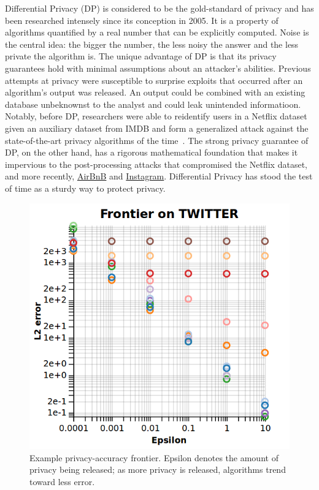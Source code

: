 \documentclass[11pt]{report}
\begin{document}
Differential Privacy (DP) is considered to be the gold-standard of privacy and has been researched intensely since its conception in 2005. It is a property of algorithms quantified by a real number that can be explicitly computed. Noise is the central idea: the bigger the number, the less noisy the answer and the less private the algorithm is. The unique advantage of DP is that its privacy guarantees hold with minimal assumptions about an attacker's abilities. Previous attempts at privacy were susceptible to surprise exploits that occurred after an algorithm's output was released. An output could be combined with an existing database unbeknownst to the analyst and could leak unintended informatioon. Notably, before DP, researchers were able to reidentify users in a Netflix dataset given an auxiliary dataset from IMDB and form a generalized attack against the state-of-the-art privacy algorithms of the time~\cite{Narayanan:2006}. The strong privacy guarantee of DP, on the other hand, has a rigorous mathematical foundation that makes it impervious to the post-processing attacks that compromised the Netflix dataset, and more recently, \href{https://hackernoon.com/how-to-rob-an-airbnb-252e7e7eda44}{AirBnB} and \href{https://gizmodo.com/this-is-almost-certainly-james-comey-s-twitter-account-1793843641}{Instagram}. Differential Privacy has stood the test of time as a sturdy way to protect privacy.
\begin{figure}
\begin{center}
\includegraphics[scale=0.25]{Frontier}
\end{center}
\caption{Example privacy-accuracy frontier. Epsilon denotes the amount of privacy being released; as more privacy is released, algorithms trend toward less error.}\label{fig:frontier}
\end{figure}
\end{document}
